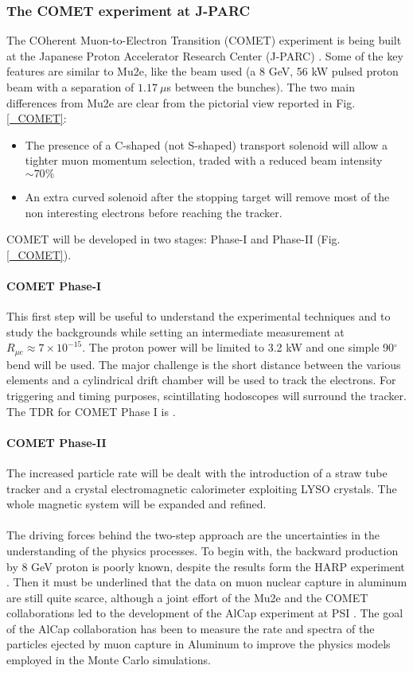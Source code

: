 \documentclass[12pt,a4paper,openright, oneside, titlepage]{book} %
\begin{document}
 


\subsubsection{The COMET experiment at J-PARC}
The COherent Muon-to-Electron Transition (COMET) experiment is being built at the Japanese Proton Accelerator Research Center (J-PARC) \cite{COMET_I}. Some of the key features are similar to Mu2e, like the beam used (a 8 GeV, 56 kW pulsed proton beam with a separation of $1.17\ \mu$s between the bunches). 
The two main differences from Mu2e are clear from the pictorial view reported in Fig. \ref{_COMET}:
\begin{itemize}
\item The presence of a C-shaped (not S-shaped) transport solenoid will allow a tighter muon momentum selection, 
traded with a reduced beam intensity $\sim 70\%$
\item An extra curved solenoid after the stopping target will remove most of the non interesting electrons 
before reaching the tracker.
\end{itemize}
COMET will be developed in two stages: Phase-I and Phase-II (Fig. \ref{_COMET}).
\paragraph{COMET Phase-I}
This first step will be useful to understand the experimental techniques and to study the backgrounds while setting an intermediate measurement at $R_{\mu e}\approx7\times10^{-15}$. 
The proton power will be limited to 3.2 kW and one simple 90$^\circ$ bend will be used. 
The major challenge is the short distance between the various elements and a cylindrical drift chamber will be used to track the electrons. For triggering and timing purposes, scintillating hodoscopes will surround the tracker. 
The TDR for COMET Phase I is \cite{COMET_I}.
\paragraph{COMET Phase-II}
The increased particle rate will be dealt with the introduction of a straw tube tracker 
and a crystal electromagnetic calorimeter exploiting LYSO crystals. 
The whole magnetic system will be expanded and refined.\\ \\
The driving forces behind the two-step approach are the uncertainties in the understanding of the physics processes. 
To begin with, the backward production by 8 GeV proton is poorly known, 
despite the results form the HARP experiment \cite{HARP}.
Then it must be underlined that the data on muon nuclear capture in aluminum are still quite scarce, 
although a joint effort of the Mu2e and the COMET collaborations led to the development of the AlCap experiment at PSI \cite{Edmonds:2015}\cite{AlCap:2015}\cite{AlCap:2018}. 
The goal of the AlCap collaboration has been to measure the rate and spectra of the particles ejected by muon capture in Aluminum to improve the physics models employed in the Monte Carlo simulations.
\end{document}
